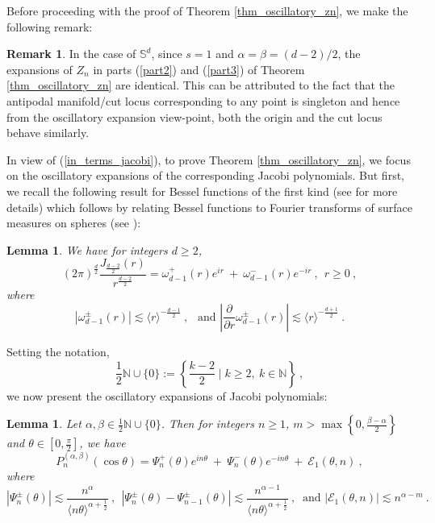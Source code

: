 \documentclass[12pt]{amsart}
\newtheorem{lemma}[theorem]{Lemma}
\theoremstyle{definition}
\newtheorem{remark}[theorem]{Remark}
\newcommand{\N}{\mathbb N}%
\newcommand{\Sb}{\mathbb S}%
\numberwithin{equation}{section}
\begin{document}
Before proceeding with the proof of Theorem \ref{thm_oscillatory_zn}, we make the following remark:
\begin{remark} \label{epxansion_symmetry_sphere}
In the case of $\Sb^d$, since $s=1$ and $\alpha=\beta=(d-2)/2$, the expansions of $Z_n$ in parts (\ref{part2}) and (\ref{part3}) of Theorem \ref{thm_oscillatory_zn} are identical. This can be attributed to the fact that the antipodal manifold/cut locus corresponding to any point is singleton and hence from the oscillatory expansion view-point, both the origin and the cut locus behave similarly.
\end{remark}

In view of (\ref{in_terms_jacobi}), to prove Theorem \ref{thm_oscillatory_zn}, we focus on the oscillatory expansions of the corresponding Jacobi polynomials. But first, we recall the following result for Bessel functions of the first kind (see \cite{Szego} for more details) which follows by relating Bessel functions to Fourier transforms of surface measures on spheres (see \cite[p. 7]{MathZ}): 
\begin{lemma} \label{Bessel_function_expansion}
We have for integers $d \ge 2$,
\begin{equation*}
(2\pi)^{\frac{d}{2}} \frac{J_{\frac{d-2}{2}}(r)}{r^\frac{d-2}{2}} = \omega^+_{d-1}(r)e^{ir}\:+\:\omega^-_{d-1}(r)e^{-ir}\:,\:\:r \ge 0\:,
\end{equation*}
where
\begin{equation} \label{coefficient_estimates}
\left|\omega^\pm_{d-1}(r)\right| \lesssim \langle r\rangle^{-\frac{d-1}{2}}\:,\:\:\text{ and } 
\left|\frac{\partial}{\partial r}\omega^\pm_{d-1}(r)\right| \lesssim \langle r\rangle^{-\frac{d+1}{2}}\:.
\end{equation}
\end{lemma}
Setting the notation,
\begin{equation*}
\frac{1}{2}\N \cup\{0\}:=\left\{\frac{k-2}{2} \mid k \ge 2,\:k\in \N\right\}\:,
\end{equation*}
we now present the oscillatory expansions of Jacobi polynomials:
\begin{lemma} \label{jacobi_lemma1}
Let $\alpha,\beta \in \frac{1}{2}\N \cup \{0\}$. Then for integers $n \ge 1$, $m>\max \left\{0,\frac{\beta - \alpha}{2}\right\}$ and $\theta \in \left[0,\frac{\pi}{2}\right]$, we have
\begin{equation*}
P^{(\alpha, \beta)}_n(\cos \theta)=\Psi^+_n(\theta)e^{in\theta}\:+\:\Psi^-_n(\theta)e^{-in\theta}\:+\:\mathcal{E}_1(\theta,n)\:,
\end{equation*}
where
\begin{equation*}
\left|\Psi^\pm_n(\theta)\right|\lesssim \frac{n^\alpha}{\langle n \theta \rangle^{\alpha+\frac{1}{2}}}\:,\:\: \left|\Psi^\pm_n(\theta)-\Psi^\pm_{n-1}(\theta)\right|\lesssim \frac{n^{\alpha-1}}{\langle n \theta \rangle^{\alpha +\frac{1}{2}}}\:,\:\text{ and } \left|\mathcal{E}_1(\theta,n)\right| \lesssim n^{\alpha-m}\:. 
\end{equation*}
\end{lemma}
\end{document}
